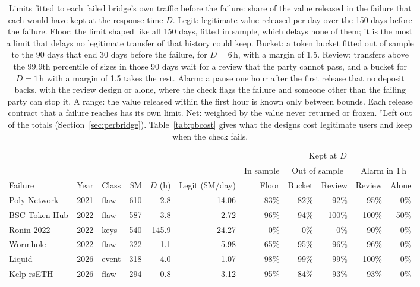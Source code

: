 \begin{table}[t]
\centering
\caption{Limits fitted to each failed bridge's own traffic before the failure: share of the value released in the failure that each would have kept at the response time $D$. Legit: legitimate value released per day over the 150 days before the failure. Floor: the limit shaped like all 150 days, fitted in sample, which delays none of them; it is the most a limit that delays no legitimate transfer of that history could keep. Bucket: a token bucket fitted out of sample to the 90 days that end 30 days before the failure, for $D = 6$\,h, with a margin of 1.5. Review: transfers above the 99.9th percentile of sizes in those 90 days wait for a review that the party cannot pass, and a bucket for $D = 1$\,h with a margin of 1.5 takes the rest. Alarm: a pause one hour after the first release that no deposit backs, with the review design or alone, where the check flags the failure and someone other than the failing party can stop it. A range: the value released within the first hour is known only between bounds. Each release contract that a failure reaches has its own limit. Net: weighted by the value never returned or frozen. $^\dagger$Left out of the totals (Section~\ref{sec:perbridge}). Table~\ref{tab:pbcost} gives what the designs cost legitimate users and keep when the check fails.}
\label{tab:perbridge}
\footnotesize
\setlength{\tabcolsep}{4pt}
\begin{tabular}{@{}l l l r r r r r r r r@{}}
\toprule
 & & & & & & \multicolumn{5}{c}{Kept at $D$}  \\
\cmidrule(l){7-11}
 & & & & & & In sample & \multicolumn{2}{c}{Out of sample} & \multicolumn{2}{c}{Alarm in 1\,h}  \\
\cmidrule(lr){7-7} \cmidrule(lr){8-9} \cmidrule(l){10-11}
Failure & Year & Class & \$M & $D$ (h) & Legit (\$M/day) & Floor & Bucket & Review & Review & Alone \\
\midrule
Poly Network & 2021 & flaw & 610 & 2.8 & 14.06 & 83\% & 82\% & 92\% & 95\% & 0\% \\
BSC Token Hub & 2022 & flaw & 587 & 3.8 & 2.72 & 96\% & 94\% & 100\% & 100\% & 50\% \\
Ronin 2022 & 2022 & keys & 540 & 145.9 & 24.27 & 0\% & 0\% & 0\% & 90\% & 0\% \\
Wormhole & 2022 & flaw & 322 & 1.1 & 5.98 & 65\% & 95\% & 96\% & 96\% & 0\% \\
Liquid & 2026 & event & 318 & 4.0 & 1.07 & 98\% & 99\% & 99\% & 100\% & 0\% \\
Kelp rsETH & 2026 & flaw & 294 & 0.8 & 3.12 & 95\% & 84\% & 93\% & 93\% & 0\% \\

\end{tabular}
\end{table}
